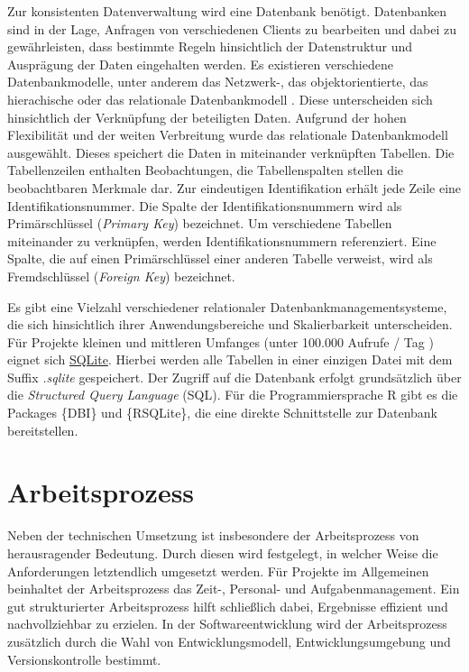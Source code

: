\documentclass[
]{article}
\begin{document}
Zur konsistenten Datenverwaltung wird eine Datenbank benötigt. Datenbanken sind in der Lage, Anfragen von verschiedenen Clients zu bearbeiten und dabei zu gewährleisten, dass bestimmte Regeln hinsichtlich der Datenstruktur und Ausprägung der Daten eingehalten werden. Es existieren verschiedene Datenbankmodelle, unter anderem das Netzwerk-, das objektorientierte, das hierachische oder das relationale Datenbankmodell \autocite{laudon2015}. Diese unterscheiden sich hinsichtlich der Verknüpfung der beteiligten Daten. Aufgrund der hohen Flexibilität und der weiten Verbreitung wurde das relationale Datenbankmodell ausgewählt. Dieses speichert die Daten in miteinander verknüpften Tabellen. Die Tabellenzeilen enthalten Beobachtungen, die Tabellenspalten stellen die beobachtbaren Merkmale dar. Zur eindeutigen Identifikation erhält jede Zeile eine Identifikationsnummer. Die Spalte der Identifikationsnummern wird als Primärschlüssel (\emph{Primary Key}) bezeichnet. Um verschiedene Tabellen miteinander zu verknüpfen, werden Identifikationsnummern referenziert. Eine Spalte, die auf einen Primärschlüssel einer anderen Tabelle verweist, wird als Fremdschlüssel (\emph{Foreign Key}) bezeichnet.

Es gibt eine Vielzahl verschiedener relationaler Datenbankmanagementsysteme, die sich hinsichtlich ihrer Anwendungsbereiche und Skalierbarkeit unterscheiden. Für Projekte kleinen und mittleren Umfanges (unter 100.000 Aufrufe / Tag \autocite{whysqlite}) eignet sich \href{https://www.sqlite.org/index.html}{SQLite}. Hierbei werden alle Tabellen in einer einzigen Datei mit dem Suffix \emph{.sqlite} gespeichert. Der Zugriff auf die Datenbank erfolgt grundsätzlich über die \emph{Structured Query Language} (SQL). Für die Programmiersprache R gibt es die Packages \{DBI\} und \{RSQLite\}, die eine direkte Schnittstelle zur Datenbank bereitstellen.

\hypertarget{workflow}{%
\section{Arbeitsprozess}\label{workflow}}

Neben der technischen Umsetzung ist insbesondere der Arbeitsprozess von herausragender Bedeutung. Durch diesen wird festgelegt, in welcher Weise die Anforderungen letztendlich umgesetzt werden. Für Projekte im Allgemeinen beinhaltet der Arbeitsprozess das Zeit-, Personal- und Aufgabenmanagement. Ein gut strukturierter Arbeitsprozess hilft schließlich dabei, Ergebnisse effizient und nachvollziehbar zu erzielen. In der Softwareentwicklung wird der Arbeitsprozess zusätzlich durch die Wahl von Entwicklungsmodell, Entwicklungsumgebung und Versionskontrolle bestimmt.
\end{document}
